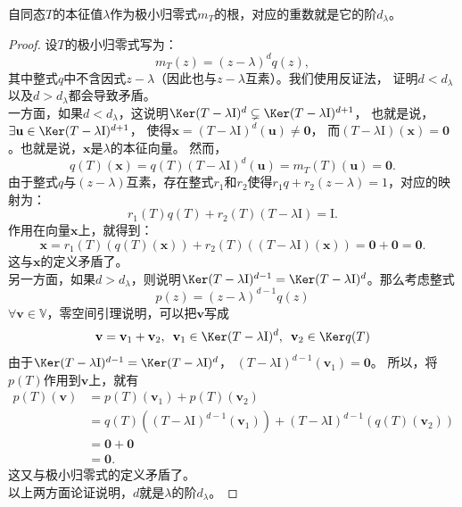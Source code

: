 \documentclass[12pt,UTF8,fontset=none]{ctexbook}
\begin{document}
\begin{pp}\label{pp:6_12_5}
    自同态$T$的本征值$\lambda$作为极小归零式$m_T$的根，对应的重数就是它的阶$d_\lambda$。
\end{pp}
\begin{proof} %
设$T$的极小归零式写为：
$$ m_T(z) = (z - \lambda)^d q(z),$$
其中整式$q$中不含因式$z - \lambda$（因此也与$z - \lambda$互素）。我们使用反证法，
证明$d < d_{\lambda}$以及$d > d_{\lambda}$都会导致矛盾。\\
一方面，如果$d < d_{\lambda}$，这说明$\Ker (T - \lambda\mathrm{I})^{d} \subsetneq \Ker (T - \lambda\mathrm{I})^{d+1}$，
也就是说，$\exists \mathbf{u}\in \Ker (T - \lambda\mathrm{I})^{d+1}$，
使得$\mathbf{x} = (T - \lambda\mathrm{I})^{d}(\mathbf{u}) \neq \mathbf{0}$，
而$(T - \lambda\mathrm{I})(\mathbf{x}) = \mathbf{0}$。也就是说，$\mathbf{x}$是$\lambda$的本征向量。
然而，
$$q(T)(\mathbf{x}) = q(T)(T - \lambda\mathrm{I})^{d}(\mathbf{u}) = m_T(T)(\mathbf{u}) = \mathbf{0}.$$ 
由于整式$q$与$(z - \lambda)$互素，存在整式$r_1$和$r_2$使得$r_1 q + r_2 (z - \lambda) = 1$，对应的映射为：
$$ r_1(T) q(T) + r_2(T) (T - \lambda \mathrm{I}) = \mathrm{I}. $$
作用在向量$\mathbf{x}$上，就得到：
$$ \mathbf{x} = r_1(T) (q(T)(\mathbf{x})) + r_2(T)((T - \lambda \mathrm{I})(\mathbf{x})) = \mathbf{0} + \mathbf{0} = \mathbf{0}. $$
这与$\mathbf{x}$的定义矛盾了。 \\
另一方面，如果$d > d_{\lambda}$，则说明$\Ker (T - \lambda\mathrm{I})^{d - 1} = \Ker (T - \lambda\mathrm{I})^{d}$。那么考虑整式
$$p(z) = (z - \lambda)^{d-1} q(z)$$
$\forall \mathbf{v} \in \mathbb{V}$，零空间引理说明，可以把$\mathbf{v}$写成
$$\mathbf{v} = \mathbf{v}_1 + \mathbf{v}_2, \,\,\, \mathbf{v}_1 \in \Ker (T - \lambda\mathrm{I})^{d}, \,\,\, \mathbf{v}_2 \in \Ker q(T) $$
由于$\Ker (T - \lambda\mathrm{I})^{d- 1} = \Ker (T - \lambda\mathrm{I})^{d}$，
$(T - \lambda\mathrm{I})^{d- 1}(\mathbf{v}_1) = \mathbf{0}$。
所以，将$p(T)$作用到$\mathbf{v}$上，就有
\begin{align*} 
    p(T)(\mathbf{v}) &= p(T)(\mathbf{v}_1) + p(T)(\mathbf{v}_2)  \\
    &= q(T)((T - \lambda\mathrm{I})^{d- 1}(\mathbf{v}_1)) + (T - \lambda\mathrm{I})^{d- 1}(q(T)(\mathbf{v}_2))  \\
    &= \mathbf{0} + \mathbf{0}  \\
    &= \mathbf{0}. 
\end{align*}
这又与极小归零式的定义矛盾了。\\
以上两方面论证说明，$d$就是$\lambda$的阶$d_{\lambda}$。

\end{proof}
\end{document}
